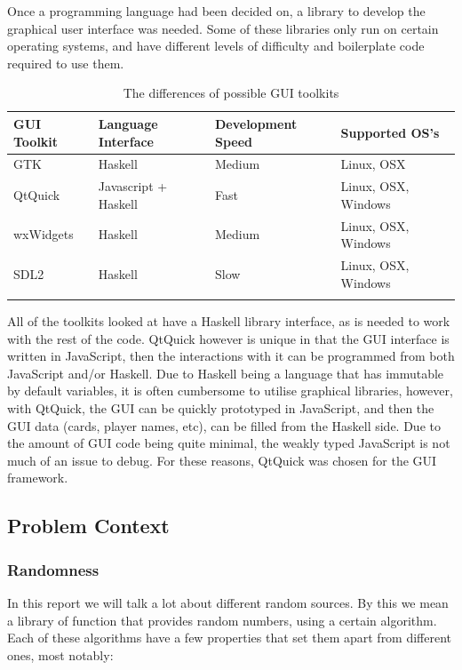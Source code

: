 Once a programming language had been decided on, a library to develop the
graphical user interface was needed. Some of these libraries only run on
certain operating systems, and have different levels of difficulty and
boilerplate code required to use them.

\begin{table}[H]
    \begin{adjustbox}{center}
    \begin{tabular}{l l l l}
    \toprule
    GUI Toolkit & Language Interface    & Development Speed & Supported OS's        \\
    \midrule
    GTK         & Haskell               & Medium            & Linux, OSX            \\ \addlinespace
    QtQuick     & Javascript + Haskell  & Fast              & Linux, OSX, Windows   \\ \addlinespace
    wxWidgets   & Haskell               & Medium            & Linux, OSX, Windows   \\ \addlinespace
    SDL2        & Haskell               & Slow              & Linux, OSX, Windows   \\ \addlinespace
    \bottomrule
    \end{tabular}
    \end{adjustbox}
    \caption{The differences of possible GUI toolkits}
\end{table}

All of the toolkits looked at have a Haskell library interface, as is needed
to work with the rest of the code. QtQuick however is unique in that the GUI
interface is written in JavaScript, then the interactions with it can be
programmed from both JavaScript and/or Haskell. Due to Haskell being a language
that has immutable by default variables, it is often cumbersome to utilise
graphical libraries, however, with QtQuick, the GUI can be quickly prototyped
in JavaScript, and then the GUI data (cards, player names, etc), can be filled
from the Haskell side. Due to the amount of GUI code being quite minimal, the
weakly typed JavaScript is not much of an issue to debug. For these reasons,
QtQuick was chosen for the GUI framework.

\subsection{Problem Context}

\subsubsection{Randomness}
In this report we will talk a lot about different random sources. By this we
mean a library of function that provides random numbers, using a certain
algorithm. Each of these algorithms have a few properties that set them apart
from different ones, most notably:

